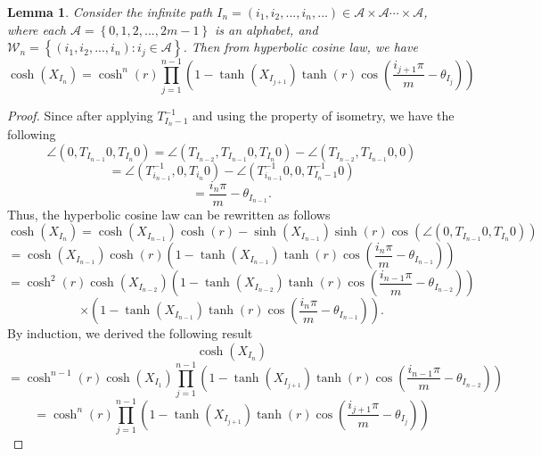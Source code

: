 \documentclass[12pt,oneside]{sfsuthesis}
\theoremstyle{plain} %
\newtheorem{lemma}[theorem]{Lemma}
\theoremstyle{definition}  %
\theoremstyle{remark}  %
\theoremstyle{plain}
\begin{document}
{\begin{lemma}
Consider the infinite path $I_n=(i_1,i_2,...,i_n,...)\in \mathcal{A}\times\mathcal{A}\cdots\times\mathcal{A}$, where each $\mathcal{A}=\left\lbrace 0,1,2,...,2m-1\right\rbrace$ is an alphabet, and $\mathcal{W}_n=\left\lbrace 
(i_1,i_2,...,i_n):i_j\in\mathcal{A}\right\rbrace$. 
Then from hyperbolic cosine law, we have
$$
\cosh\left( X_{I_n}\right)=\cosh^n\left(r\right)\prod_{j=1}^{n-1}\left(1-\tanh\left(X_{I_{j+1}}\right)\tanh\left(r\right)\cos\left(\frac{i_{j+1}\pi}{m}-\theta_{I_j}\right)\right)
$$
\end{lemma}
\begin{proof}
Since after applying $T^{-1}_{I_n-1}$ and using the property of isometry, we have the following
$$
\angle\left(0,T_{I_{n-1}}0,T_{I_n}0\right)=\angle\left(T_{I_{n-2}},T_{I_{n-1}}0,T_{I_n}0\right)
-\angle\left(T_{I_{n-2}},T_{I_{n-1}}0,0\right)
$$
$$
=\angle\left(T^{-1}_{i_{n-1}},0,T_{i_n}0\right)-\angle\left(T^{-1}_{i_{n-1}}0,0,T^{-1}_{I_n-1}0\right)
$$
$$
=\frac{i_n\pi}{m}-\theta_{I_{n-1}}.
$$
Thus, the hyperbolic cosine law can be rewritten as follows
$$
\cosh\left( X_{I_n}\right)=\cosh\left( X_{I_{n-1}}\right)\cosh\left( r \right)
-\sinh\left( X_{I_{n-1}}\right)\sinh\left( r\right)\cos\left(\angle\left(0,T_{I_{n-1}}0,T_{I_n}0\right)\right)
$$
$$
=\cosh\left(X_{I_{n-1}}\right)\cosh\left( r\right)\left( 1- \tanh\left(X_{I_{n-1}}\right)\tanh\left(r\right)\cos\left( \frac{i_n\pi}{m}-\theta_{I_{n-1}}\right)\right)
$$
$$
=\cosh^2\left( r\right)\cosh\left(X_{I_{n-2}}\right)\left(1- \tanh\left(X_{I_{n-2}}\right)\tanh\left(r\right)\cos\left( \frac{i_{n-1}\pi}{m}-\theta_{I_{n-2}}\right)\right)
$$
$$
\times\left(1- \tanh\left(X_{I_{n-1}}\right)\tanh\left(r\right)\cos\left( \frac{i_n\pi}{m}-\theta_{I_{n-1}}\right)\right).
$$
By induction, we derived the following result
$$
\cosh\left( X_{I_n}\right)$$
$$=\cosh^{n-1}\left(r\right)\cosh\left(X_{I_{1}}\right)\prod_{j=1}^{n-1}\left( 1-\tanh\left(X_{I_{j+1}}\right)\tanh\left(r\right)\cos\left(\frac{i_{n-1}\pi}{m}-\theta_{I_{n-2}}\right)\right)
$$
$$
=\cosh^n\left(r\right)\prod_{j=1}^{n-1}\left(1-\tanh\left(X_{I_{j+1}}\right)\tanh\left(r\right)\cos\left(\frac{i_{j+1}\pi}{m}-\theta_{I_j}\right)\right)
$$
\end{proof}


}
\end{document}
